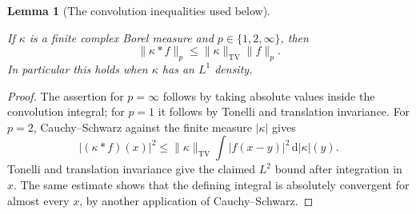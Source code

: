 \documentclass[11pt]{amsart}
\newcommand{\dd}{\,\mathrm d}
\newtheorem{lemma}[theorem]{Lemma}
\theoremstyle{definition}
\theoremstyle{remark}
\numberwithin{equation}{section}
\providecommand{\lean}[1]{}
\providecommand{\leanok}{}
\begin{document}
\begin{lemma}[The convolution inequalities used below]\label{ext:young}
\lean{Auto.ext_young_one,Auto.ext_young_two,Auto.ext_young_top}
\leanok
If $\kappa$ is a finite complex Borel measure and
$p\in\{1,2,\infty\}$, then
\[
 \|\kappa*f\|_p\le\|\kappa\|_{\mathrm{TV}}\|f\|_p.
\]
In particular this holds when $\kappa$ has an $L^1$ density.
\end{lemma}
\begin{proof}
The assertion for $p=\infty$ follows by taking absolute
values inside the convolution integral; for $p=1$ it follows
by Tonelli and translation invariance.  For $p=2$,
Cauchy--Schwarz against the finite measure $|\kappa|$ gives
\[
 |(\kappa*f)(x)|^2
 \le\|\kappa\|_{\mathrm{TV}}
             \int|f(x-y)|^2\dd|\kappa|(y).
\]
Tonelli and translation invariance give the claimed $L^2$
bound after integration in $x$.  The same estimate shows
that the defining integral is absolutely convergent for
almost every $x$, by another application of Cauchy--Schwarz.
\end{proof}
\end{document}
